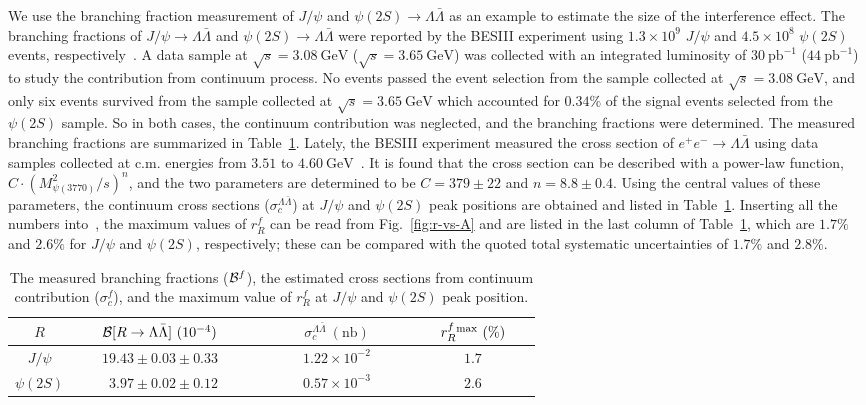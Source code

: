 \documentclass[%
preprint,
 amsmath,amssymb,
 aps,
]{revtex4-2}
\newcommand{\br}{{\cal B}}
\newcommand{\EE}{e^+e^-}
\newcommand{\psip}{\psi(2S)}
\newcommand{\psipp}{\psi(3770)}
\newcommand{\jpsi}{J/\psi}
\newcommand{\gev}{\mathrm{GeV}}
\newcommand{\invpb}{\mathrm{pb}^{-1}}
\newcommand{\nb}{\mathrm{nb}}
\begin{document}
We use the branching fraction measurement of $\jpsi$ and $\psip\to\Lambda\bar{\Lambda}$ 
as an example to estimate the size of the interference effect.
The branching fractions of $\jpsi\to\Lambda\bar{\Lambda}$ 
and $\psip\to\Lambda\bar{\Lambda}$ were reported by the BESIII experiment 
using $1.3\times 10^{9}$ $\jpsi$ and $4.5\times10^{8}$ $\psip$ events, 
respectively~\cite{bes3-br-lambda}. A data sample at $\sqrt{s}=3.08~\gev$ 
($\sqrt{s}=3.65~\gev$) was collected with an integrated luminosity of $30~\invpb$ 
($44~\invpb$) to study the contribution from continuum process. No events passed 
the event selection from the sample collected at 
$\sqrt{s}=3.08~\gev$, and only six events survived from the sample collected 
at $\sqrt{s}=3.65~\gev$ which accounted for $0.34\%$ of the signal events 
selected from the $\psip$ sample. So in both cases, the continuum contribution was
neglected, and the branching fractions were determined. The measured branching 
fractions are summarized in Table~\ref{tab:ll-int}.  Lately, the BESIII experiment measured 
the cross section of $\EE\to\Lambda\bar{\Lambda}$ using data samples collected 
at c.m. energies 
from $3.51$ to $4.60~\gev$~\cite{bes3-cs-lambda}. It is found that the cross section 
can be described with a power-law function, $C\cdot(M_{\psipp}^2/s)^n$,
and the two parameters are determined to be $C=379\pm22$ and $n=8.8\pm0.4$.
Using the central values of these parameters, the continuum cross sections 
($\sigma_c^{\Lambda\bar{\Lambda}}$) at $\jpsi$ 
and $\psip$ peak positions are obtained and listed in Table~\ref{tab:ll-int}. 
Inserting all the numbers into~, the maximum values of $r_{R}^{f}$
can be read from Fig.~\ref{fig:r-vs-A} and are 
listed in the last column of Table~\ref{tab:ll-int}, which are $1.7\%$ and $2.6\%$ 
for $\jpsi$ and $\psip$, respectively; these can be compared with the 
quoted total systematic uncertainties of $1.7\%$ and $2.8\%$.

\begin{table*}[htbp]
\caption{The measured branching fractions ($\br^f$), the estimated cross sections 
from continuum contribution ($\sigma_{c}^f$), and the maximum 
value of $r_{R}^{f}$ at $\jpsi$ and $\psip$ peak position. }
\label{tab:ll-int}
\begin{center}
\begin{tabular}{ccccc}
\hline\hline
$~R~$ &~~~$\br[R\to\Lambda\bar{\Lambda}]~(10^{-4})$~~~ 
&~~~~~~$\sigma_{c}^{\Lambda\bar{\Lambda}}~(\nb)$~~~~~~&~$r_{R}^{f}{}^{\rm max}~(\%)$~\\\hline
${\jpsi}$  & $19.43\pm0.03\pm0.33$  &  $1.22\times10^{-2}$   & $1.7$ \\
${\psip}$  &~$3.97\pm0.02\pm0.12$   &  $0.57\times10^{-3}$  & $2.6$ \\
\hline\hline
\end{tabular}
\end{center}
\end{table*}
\end{document}
